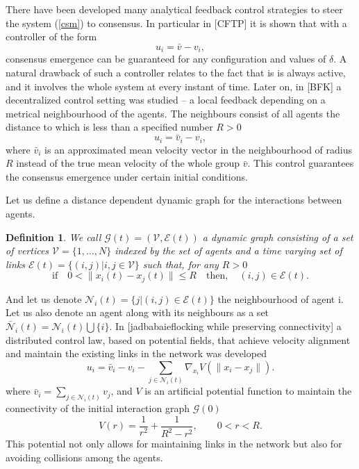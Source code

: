 \documentclass[a4paper,10pt, english]{article}
\newtheorem{dfn}{Definition}[section]
\begin{document}
There have been developed many analytical feedback control strategies  to steer the system (\ref{csm}) to consensus. In particular in [CFTP] it is shown that with a controller 
of the form
$$
u_i = \bar{v} - v_i,
$$
consensus emergence can be guaranteed for any configuration and values of $\delta$. A natural drawback of such a controller relates to the fact that is is always active, and it involves the whole system at every
instant of time. Later on,  in [BFK] a decentralized control setting  was studied \--- a local feedback depending on a metrical neighbourhood of the agents. The neighbours consist of all agents 
the distance to which is less than a specified number $R>0$
$$
u_i = \bar{v}_i - v_i,
$$
where $\bar{v}_i$ is an approximated mean velocity vector in the neighbourhood of radius $R$ instead of the true mean velocity of the whole group $\bar{v}$. This control guarantees the consensus emergence under certain initial conditions.




Let us define a distance dependent dynamic graph for the interactions between agents.
\begin{dfn}
We call $\mathcal{G}(t) =  (\mathcal{V}, \mathcal{E}(t) )$ a dynamic graph consisting of a set of vertices $\mathcal{V} = \{1, \dots,  N\}$ indexed by the set of agents and a time varying set of links 
$\mathcal{E}(t) = \{(i, j)|i, j \in \mathcal{V}\}$ such that, for any $R>0$
$$
\mbox{if}\quad 0<\|x_i(t) - x_j(t)\| \leq R \quad\mbox{then},\quad (i, j)\in \mathcal{E}(t).
$$
\end{dfn}
And let us denote $\mathcal{N}_i(t) = \{j|(i, j)\in\mathcal{E}(t)\}$ the neighbourhood of agent i.
Let us also denote an agent along with its neighbours as a set $\bar{\mathcal{N}}_i(t) = \mathcal{N}_i(t)\bigcup \{i\}$.
In [jadbabaieflocking while preserving connectivity] a distributed control law, based on potential fields, that achieve velocity alignment and maintain the existing links in the network was developed 
\begin{equation}
u_i = \bar{v}_i - v_i - \sum_{j \in \mathcal{N}_i(t)}\nabla_{x_i}V(\|x_i - x_j\|).
\label{controljad}
\end{equation}
where $\bar{v}_i = \sum_{j \in \mathcal{N}_i(t)} v_j$, and $V$ is an artificial potential function  to maintain the connectivity of the initial interaction graph $\mathcal{G}(0)$ 
\begin{equation}
 V(r) = \frac{1}{r^2} + \frac{1}{R^2 - r^2}, \qquad 0 < r < R.
\label{potential}
\end{equation}
This potential not only allows for maintaining links in the network but also for avoiding collisions among the agents.
\end{document}
